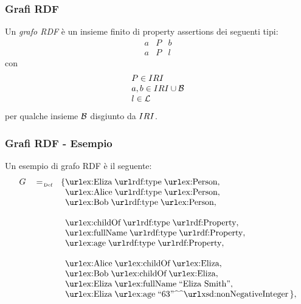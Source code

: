\documentclass[8pt]{beamer}
\begin{document}
\begin{frame}
 \frametitle{Grafi RDF}
 Un \emph{grafo RDF} \`e un insieme finito di property assertions dei seguenti tipi:
\[
 \begin{array}{rcl}
  a & P & b \\
  a & P & l
 \end{array}
\]
con 
\[
 \begin{array}{l}
 P \in IRI\\
 a, b \in IRI \cup \mathcal{B}\\
 l \in \mathcal{L}
 \end{array}
\]
per qualche insieme $\mathcal{B}$ disgiunto da $IRI$.
\vspace{\baselineskip}

\end{frame}

\newcommand{\triple}[3]{\mathurl{#1}\;\mathurl{#2}\;#3}
\newcommand{\tripleO}[3]{\mathurl{#1}\;\mathurl{#2}\;\mathurl{#3}}

\begin{frame}
 \frametitle{Grafi RDF - Esempio}
 Un esempio di grafo RDF \`e il seguente:
 \[
 \begin{array}{rcl}
  G & \defAs & \{ \tripleO{ex:Eliza}{rdf:type}{ex:Person},\\
  &&\phantom{\{} \tripleO{ex:Alice}{rdf:type}{ex:Person},\\
  &&\phantom{\{} \tripleO{ex:Bob}{rdf:type}{ex:Person},\\
  \\
  &&\phantom{\{} \tripleO{ex:childOf}{rdf:type}{rdf:Property},\\
  &&\phantom{\{} \tripleO{ex:fullName}{rdf:type}{rdf:Property},\\
  &&\phantom{\{} \tripleO{ex:age}{rdf:type}{rdf:Property},\\
  \\
  &&\phantom{\{} \tripleO{ex:Alice}{ex:childOf}{ex:Eliza},\\
  &&\phantom{\{} \tripleO{ex:Bob}{ex:childOf}{ex:Eliza},\\
  &&\phantom{\{} \triple{ex:Eliza}{ex:fullName}{\stringLiteral{Eliza Smith}},\\
  &&\phantom{\{} \triple{ex:Eliza}{ex:age}{\literal{63}{xsd:nonNegativeInteger}} \,\},\\
 \end{array}
\]
\end{frame}
\end{document}
